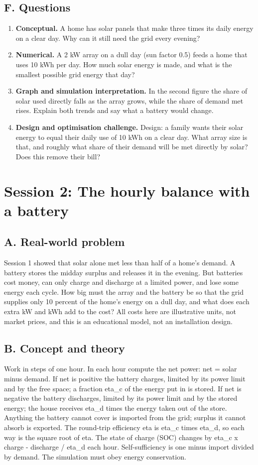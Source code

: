 \documentclass[11pt,a4paper]{article}
\begin{document}
\subsection*{F. Questions}
\begin{enumerate}[nosep]
\item \textbf{Conceptual.} A home has solar panels that make three times its daily energy on a clear day. Why can it still need the grid every evening?
\item \textbf{Numerical.} A 2 kW array on a dull day (sun factor 0.5) feeds a home that uses 10 kWh per day. How much solar energy is made, and what is the smallest possible grid energy that day?
\item \textbf{Graph and simulation interpretation.} In the second figure the share of solar used directly falls as the array grows, while the share of demand met rises. Explain both trends and say what a battery would change.
\item \textbf{Design and optimisation challenge.} Design: a family wants their solar energy to equal their daily use of 10 kWh on a clear day. What array size is that, and roughly what share of their demand will be met directly by solar? Does this remove their bill?
\end{enumerate}

\section{Session 2: The hourly balance with a battery}

\subsection*{A. Real-world problem}
Session 1 showed that solar alone met less than half of a home's demand. A battery stores the midday surplus and releases it in the evening. But batteries cost money, can only charge and discharge at a limited power, and lose some energy each cycle. How big must the array and the battery be so that the grid supplies only 10 percent of the home's energy on a dull day, and what does each extra kW and kWh add to the cost? All costs here are illustrative units, not market prices, and this is an educational model, not an installation design.

\subsection*{B. Concept and theory}
Work in steps of one hour. In each hour compute the net power: net = solar minus demand. If net is positive the battery charges, limited by its power limit and by the free space; a fraction eta\_c of the energy put in is stored. If net is negative the battery discharges, limited by its power limit and by the stored energy; the house receives eta\_d times the energy taken out of the store. Anything the battery cannot cover is imported from the grid; surplus it cannot absorb is exported. The round-trip efficiency eta is eta\_c times eta\_d, so each way is the square root of eta. The state of charge (SOC) changes by eta\_c x charge - discharge / eta\_d each hour. Self-sufficiency is one minus import divided by demand. The simulation must obey energy conservation.
\end{document}
